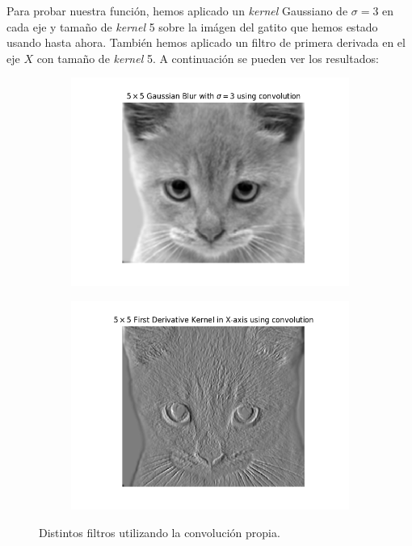 \documentclass[11pt,a4paper]{article}
\begin{document}
Para probar nuestra función, hemos aplicado un \textit{kernel} Gaussiano de $\sigma=3$ en cada eje y tamaño de \textit{kernel}
5 sobre la imágen del gatito que hemos estado usando hasta ahora. También hemos aplicado un filtro de primera derivada
en el eje $X$ con tamaño de \textit{kernel} 5. A continuación se pueden ver los resultados:

\begin{figure}[H]
\begin{subfigure}{.5\linewidth}
	\centering
	\includegraphics[scale=0.5]{img/conv1.png}
	\label{fig:conv1}
\end{subfigure}
\begin{subfigure}{.5\linewidth}
	\centering
	\includegraphics[scale=0.5]{img/conv2.png}
	\label{fig:conv2}
\end{subfigure}
\caption{Distintos filtros utilizando la convolución propia.}
\label{fig:conv}
\end{figure}
\end{document}
